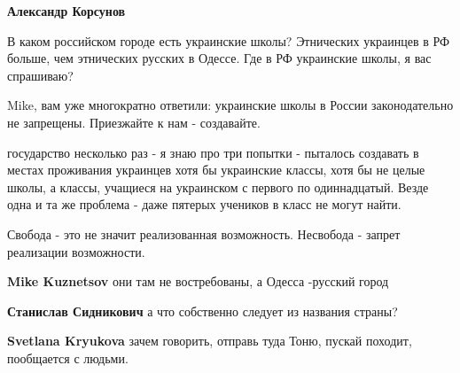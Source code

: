 \begin{itemize}
\begin{itemize}
\textbf{Александр Корсунов} 

В каком российском городе есть украинские школы? Этнических украинцев в РФ
больше, чем этнических русских в Одессе. Где в РФ украинские школы, я вас
спрашиваю?


 

Mike, вам уже многократно ответили: украинские школы в России законодательно не
запрещены. Приезжайте к нам - создавайте.

государство несколько раз - я знаю про три попытки - пыталось создавать в
местах проживания украинцев хотя бы украинские классы, хотя бы не целые школы,
а классы, учащиеся на украинском с первого по одиннадцатый. Везде одна и та же
проблема - даже пятерых учеников в класс не могут найти.

Свобода - это не значит реализованная возможность. Несвобода - запрет
реализации возможности.

 
\textbf{Mike Kuznetsov} они там не востребованы, а Одесса -русский город

 
\textbf{Станислав Сидникович} а что собственно следует из названия страны?

 
\textbf{Svetlana Kryukova} зачем говорить, отправь туда Тоню, пускай походит, пообщается с людьми.

 

\end{itemize}
\end{itemize}
